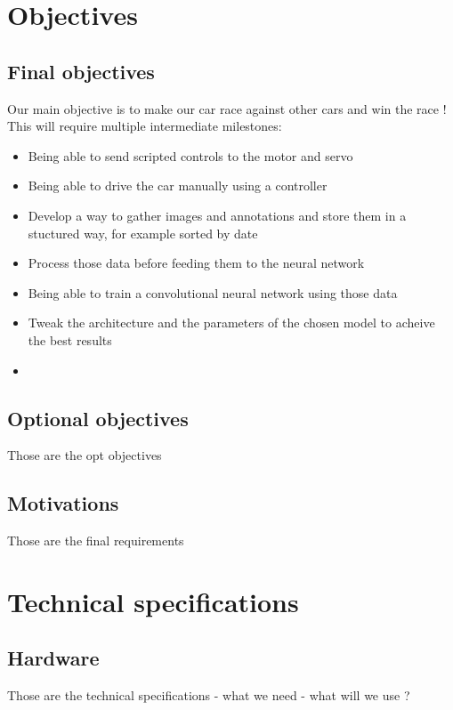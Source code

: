 \documentclass[12pt]{article}
\begin{document}
\section{Objectives}

\subsection{Final objectives}
Our main objective is to make our car race against other cars and win the race !
This will require multiple intermediate milestones:
\begin{itemize}
\item Being able to send scripted controls to the motor and servo
\item Being able to drive the car manually using a controller
\item Develop a way to gather images and annotations and store them in a stuctured way, for example sorted by date
\item Process those data before feeding them to the neural network
\item Being able to train a convolutional neural network using those data
\item Tweak the architecture and the parameters of the chosen model to acheive the best results
\item 
\end{itemize}

\subsection{Optional objectives}
Those are the opt objectives

\subsection{Motivations}
Those are the final requirements

\section{Technical specifications}

\subsection{Hardware}
Those are the technical specifications
- what we need
- what will we use ?

\end{document}

